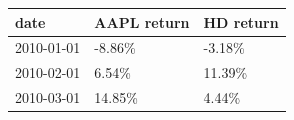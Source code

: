 \begin{tabular}{lll}
\toprule
      date & AAPL return & HD return \\
\midrule
2010-01-01 &      -8.86\% &    -3.18\% \\
2010-02-01 &       6.54\% &    11.39\% \\
2010-03-01 &      14.85\% &     4.44\% \\
\bottomrule
\end{tabular}
